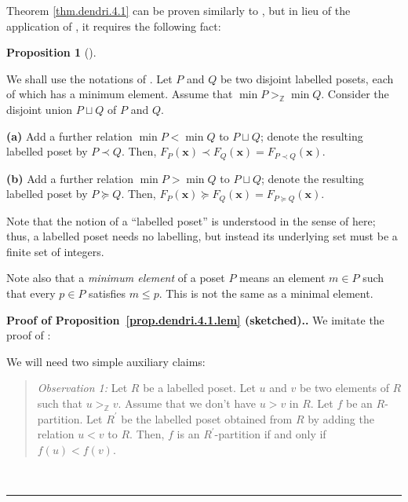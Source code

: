 \documentclass[numbers=enddot,12pt,final,onecolumn,notitlepage]{scrartcl}%
\theoremstyle{definition}
\newtheorem{prop}[theo]{Proposition}
\newenvironment{proposition}[1][]
{\begin{prop}[#1]\begin{leftbar}}
{\end{leftbar}\end{prop}}
\newenvironment{statement}{\begin{quote}}{\end{quote}}
\newenvironment{proof}[1][Proof]{\noindent\textbf{#1.} }{\ \rule{0.5em}{0.5em}}
\newenvironment{verlong}{}{}
\newcommand{\ZZ}{\mathbb{Z}}
\begin{document}
\begin{verlong}
Theorem \ref{thm.dendri.4.1} can be proven similarly to \cite[(5.2.6)]%
{HopfComb}, but in lieu of the application of \cite[Lemma 5.2.17]{HopfComb},
it requires the following fact:

\begin{proposition}
\label{prop.dendri.4.1.lem}We shall use the notations of \cite[Section
5.2]{HopfComb}. Let $P$ and $Q$ be two disjoint labelled posets, each of which
has a minimum element. Assume that $\min P>_{\mathbb{Z}}\min Q$. Consider the
disjoint union $P\sqcup Q$ of $P$ and $Q$.

\textbf{(a)} Add a further relation $\min P<\min Q$ to $P\sqcup Q$; denote the
resulting labelled poset by $P\left.  \prec\right.  Q$. Then, $F_{P}\left(
\mathbf{x}\right)  \left.  \prec\right.  F_{Q}\left(  \mathbf{x}\right)
=F_{P\left.  \prec\right.  Q}\left(  \mathbf{x}\right)  $.

\textbf{(b)} Add a further relation $\min P>\min Q$ to $P\sqcup Q$; denote the
resulting labelled poset by $P\left.  \succeq\right.  Q$. Then, $F_{P}\left(
\mathbf{x}\right)  \left.  \succeq\right.  F_{Q}\left(  \mathbf{x}\right)
=F_{P\left.  \succeq\right.  Q}\left(  \mathbf{x}\right)  $.
\end{proposition}

Note that the notion of a ``labelled poset'' is understood in the sense
of \cite[Definition 5.2.1]{HopfComb} here; thus, a labelled poset needs no
labelling, but instead its underlying set must be a finite set of integers.

Note also that a \textit{minimum element} of a poset $P$ means an element
$m \in P$ such that every $p \in P$ satisfies $m \leq p$.
This is not the same as a minimal element.

\begin{proof}[Proof of Proposition~\ref{prop.dendri.4.1.lem} (sketched).]
We imitate the proof of \cite[Lemma 5.2.17]{HopfComb}:

We will need two simple auxiliary claims:

\begin{statement}
\textit{Observation 1:} Let $R$ be a labelled poset. Let $u$ and $v$ be
two elements of $R$ such that $u >_{\ZZ} v$.
Assume that we don't have $u > v$ in $R$.
Let $f$ be an $R$-partition.
Let $R^{\prime}$ be the labelled poset obtained from $R$ by adding the
relation $u < v$ to $R$.
Then, $f$ is an $R^{\prime}$-partition if and only if
$f \left(u\right) < f\left(v\right)$.
\end{statement}


\end{proof}
\end{verlong}
\end{document}
